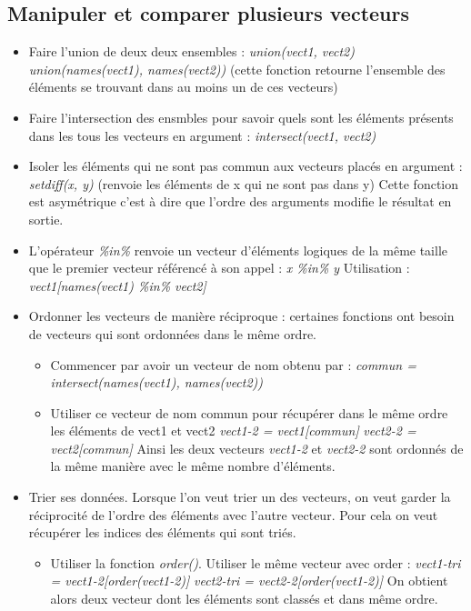 \documentclass[12pt,a4paper]{article}
\begin{document}
\subsection{Manipuler et comparer plusieurs vecteurs}
\begin{itemize}
\item Faire l'union de deux deux ensembles : \textit{union(vect1, vect2)} 
\newline \textit{union(names(vect1), names(vect2))} (cette fonction retourne l'ensemble des éléments se trouvant dans au moins un de ces vecteurs)
\item Faire l'intersection des ensmbles pour savoir quels sont les éléments présents dans les tous les vecteurs en argument : \textit{intersect(vect1, vect2)}
\item Isoler les éléments qui ne sont pas commun aux vecteurs placés en argument : \textit{setdiff(x, y)} (renvoie les éléments de x qui ne sont pas dans y)
\newline Cette fonction est asymétrique c'est à dire que l'ordre des arguments modifie le résultat en sortie.
\item L'opérateur \textit{\%in\%} renvoie un vecteur d'éléments logiques de la même taille que le premier vecteur référencé à son appel : \textit{x \%in\% y}
\newline Utilisation : \textit{vect1[names(vect1) \%in\% vect2]}
\item Ordonner les vecteurs de manière réciproque : certaines fonctions ont besoin de vecteurs qui sont ordonnées dans le même ordre.
\begin{itemize}
\item Commencer par avoir un vecteur de nom obtenu par : 
\newline \textit{commun = intersect(names(vect1), names(vect2))}
\item Utiliser ce vecteur de nom commun pour récupérer dans le même ordre les éléments de vect1 et vect2
\newline \textit{vect1-2 = vect1[commun]}
\newline \textit{vect2-2 = vect2[commun]}
\newline Ainsi les deux vecteurs \textit{vect1-2} et \textit{vect2-2} sont ordonnés de la même manière avec le même nombre d'éléments.
\end{itemize}
\item Trier ses données. Lorsque l'on veut trier un des vecteurs, on veut garder la réciprocité de l'ordre des éléments avec l'autre vecteur. Pour cela on veut récupérer les indices des éléments qui sont triés.
\begin{itemize}
\item Utiliser la fonction \textit{order()}. Utiliser le même vecteur avec order :
\newline \textit{vect1-tri = vect1-2[order(vect1-2)]}
\newline \textit{vect2-tri = vect2-2[order(vect1-2)]}
\newline On obtient alors deux vecteur dont les éléments sont classés et dans même ordre.
\end{itemize}
\end{itemize}
\end{document}
